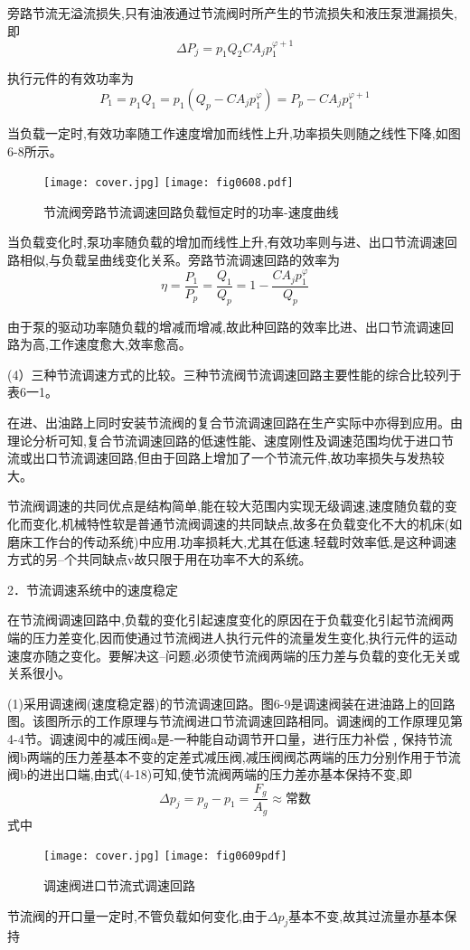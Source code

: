 旁路节流无溢流损失,只有油液通过节流阀时所产生的节流损失和液压泵泄漏损失,即
$$
\varDelta P_j=p_1Q_2CA_jp_{1}^{\varphi +1}
$$

执行元件的有效功率为
$$
P_1=p_1Q_1=p_1\left( Q_p-CA_jp_{1}^{\varphi} \right) =P_p-CA_jp_{1}^{\varphi +1}
$$

当负载一定时,有效功率随工作速度增加而线性上升,功率损失则随之线性下降,如图6-8所示。

\begin{figure}
\centering
\ifOpenSource
\texttt{[image: cover.jpg]}   %
\else 
\texttt{[image: fig0608.pdf]}  %
\fi
\caption{节流阀旁路节流调速回路负载恒定时的功率-速度曲线}
\label{fig:fig0608}
\end{figure}

当负载变化时,泵功率随负载的增加而线性上升,有效功率则与进、出口节流调速回路相似,与负载呈曲线变化关系。旁路节流调速回路的效率为
$$
\eta =\frac{P_1}{P_p}=\frac{Q_1}{Q_p}=1-\frac{CA_jp_{1}^{\varphi}}{Q_p}
$$

由于泵的驱动功率随负载的增减而增减,故此种回路的效率比进、出口节流调速回路为高,工作速度愈大,效率愈高。

(4）三种节流调速方式的比较。三种节流阀节流调速回路主要性能的综合比较列于表6一1。

在进、出油路上同时安装节流阀的复合节流调速回路在生产实际中亦得到应用。由理论分析可知,复合节流调速回路的低速性能、速度刚性及调速范围均优于进口节流或出口节流调速回路,但由于回路上增加了一个节流元件,故功率损失与发热较大。

节流阀调速的共同优点是结构简单,能在较大范围内实现无级调速,速度随负载的变化而变化,机械特性软是普通节流阀调速的共同缺点,故多在负载变化不大的机床(如磨床工作台的传动系统)中应用.功率损耗大,尤其在低速.轻载时效率低,是这种调速方式的另--个共同缺点v故只限于用在功率不大的系统。

2．节流调速系统中的速度稳定

在节流阀调速回路中,负载的变化引起速度变化的原因在于负载变化引起节流阀两端的压力差变化,因而使通过节流阀进人执行元件的流量发生变化,执行元件的运动速度亦随之变化。要解决这--问题,必须使节流阀两端的压力差与负载的变化无关或关系很小。

(1)采用调速阀(速度稳定器)的节流调速回路。图6-9是调速阀装在进油路上的回路图。该图所示的工作原理与节流阀进口节流调速回路相同。调速阀的工作原理见第4-4节。调速阅中的减压阀a是-一种能自动调节开口量，进行压力补偿﹐保持节流阀b两端的压力差基本不变的定差式减压阀,减压阀阀芯两端的压力分别作用于节流阀b的进出口端,由式(4-18)可知,使节流阀两端的压力差亦基本保持不变,即
$$
\varDelta p_j=p_g-p_1=\frac{F_g}{A_g}\approx \text{常数}
$$
式中 \quad
{}

\begin{figure}
\centering
\ifOpenSource
\texttt{[image: cover.jpg]}   %
\else 
\texttt{[image: fig0609pdf]}  %
\fi
\caption{调速阀进口节流式调速回路}
\label{fig:fig0609}
\end{figure}

节流阀的开口量一定时,不管负载如何变化,由于$\varDelta p_j$基本不变,故其过流量亦基本保持

